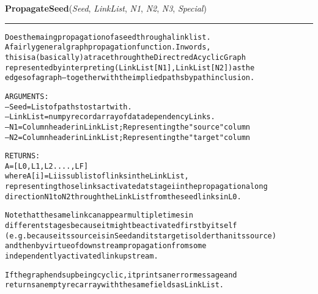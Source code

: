     \label{System:LinkManagement:PropagateSeed}

    \vspace{0.5ex}

\hspace{.8\funcindent}\begin{boxedminipage}{\funcwidth}

    \raggedright \textbf{PropagateSeed}(\textit{Seed}, \textit{LinkList}, \textit{N1}, \textit{N2}, \textit{N3}, \textit{Special})

    \vspace{-1.5ex}

    \rule{\textwidth}{0.5\fboxrule}
\setlength{\parskip}{2ex}
\begin{alltt}

Does the maing propagation of a seed through a linklist.   
A fairly general graph propagation function.  In words, 
this is a (basically) a trace through the Directred Acyclic Graph 
represented by interpreting (LinkList[N1],LinkList[N2]) as the 
edges of a graph -- together with the implied paths by path inclusion.   
        
ARGUMENTS:
--Seed = List of paths to start with. 
--LinkList = numpy record array of data dependency Links.       
--N1 = Column header in LinkList ; Representing the "source" column
--N2 = Column header in LinkList ; Representing the "target" column
                
RETURNS:
        A = [L0,L1,L2 ...., LF]
where A[i]  = Li is sublist of links in the LinkList, 
representing those links activated at stage i in the propagation along
direction N1 to N2 through the LinkList from the seed links in L0.  
                
Note that the same link can appear multiple times in 
different stages because it might be activated first by itself 
(e.g. because its source is in Seed and its target is older than its source) 
and then by virtue of downstream propagation from some 
independently activated link upstream. 
                
If the graph ends up being cyclic, it prints an error message and
returns an empty recarray with the same fields as LinkList.
        
\end{alltt}

\setlength{\parskip}{1ex}
    \end{boxedminipage}

